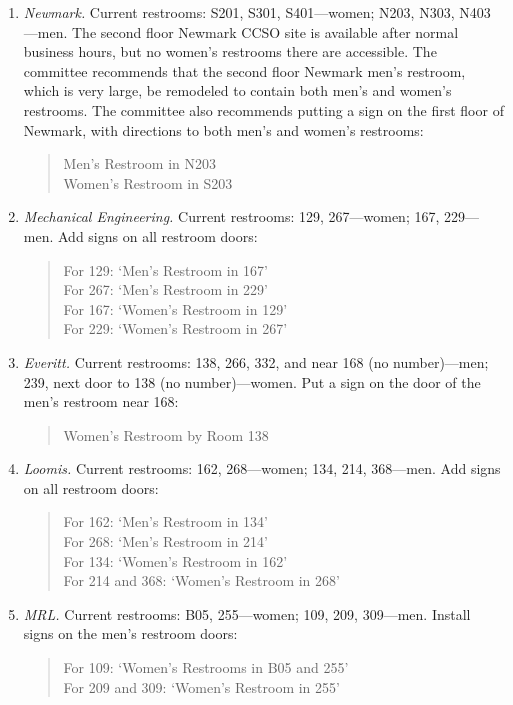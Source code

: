 \begin{enumerate}

\item  {\em Newmark.}
Current restrooms:  
S201, S301, S401---women;
N203, N303, N403---men.
The second floor Newmark CCSO site is available 
      after normal business
hours, but no women's restrooms there are accessible.
The committee recommends that the second floor Newmark men's
restroom, which is very large, be remodeled
to contain both men's and  women's restrooms.
The committee also recommends putting a sign on the first
floor of Newmark, with directions to both men's and
women's restrooms:
\begin{quote}
Men's Restroom in N203\\
Women's Restroom in S203
\end{quote}

\item
{\em Mechanical Engineering.}
Current restrooms:
129, 267---women;
167, 229---men.
Add signs on all restroom doors:
\begin{quote}
For 129:  `Men's Restroom in 167'\\
For  267:  `Men's Restroom in 229' \\
For 167:  `Women's Restroom in 129' \\
For 229:  `Women's Restroom in 267'
\end{quote}

\item
{\em Everitt.}
Current restrooms:
138,
266, 332, and near 168 (no number)---men;
239, next door to 138 (no number)---women.
Put a sign on the door of the men's restroom  near 168:
\begin{quote}
Women's Restroom by Room 138
\end{quote}


\item
{\em Loomis.}
Current restrooms:
162, 268---women;
134, 214, 368---men.
Add signs on all restroom doors:
\begin{quote}
For 162:  `Men's Restroom in 134'\\
For  268:  `Men's Restroom in 214'\\
For 134:  `Women's Restroom in 162'\\
For  214 and 368:  `Women's Restroom in 268'\\
\end{quote}


\item
{\em MRL.}
Current restrooms:
B05, 255---women;
109, 209, 309---men.
Install signs on the men's restroom doors:
\begin{quote}
For 109:  `Women's Restrooms in B05 and 255' \\
For 209 and 309:  `Women's Restroom in 255' 
\end{quote}



\end{enumerate}
